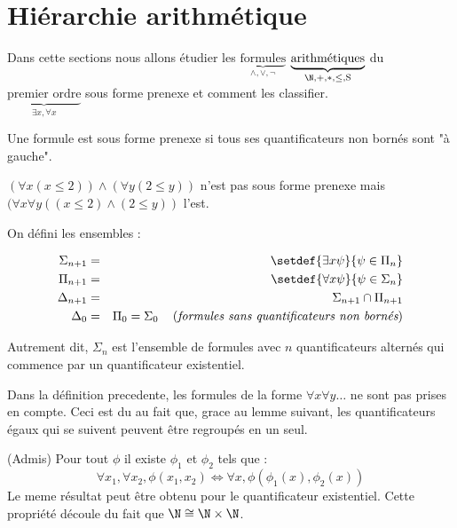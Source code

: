 \section{Hiérarchie arithmétique}


Dans cette sections nous allons étudier les $\underbrace{\text{formules}}_{\land, \lor, \lnot}$
$\underbrace{\text{arithmétiques}}_{\N, +, *, \leq, \text{S}}$ du $\underbrace{\text{premier ordre}}_{\exists x, \forall x}$
sous forme prenexe et comment les classifier.


\begin{definition}
	Une formule est sous forme prenexe si tous ses quantificateurs non bornés sont "à gauche".

	$(\forall x (x \leq 2)) \land  (\forall y (2 \leq y))$ n'est pas sous forme prenexe mais $(\forall x \forall y ((x \leq 2) \land  (2 \leq y))$ l'est.
\end{definition}



\begin{definition}
	On défini les ensembles :

	\begin{eqnarray*}
		\Sigma_{n + 1} &=& \setdef { \exists x \psi } {\psi \in \Pi_n}  \\
		\Pi_{n + 1} &=& \setdef { \forall x \psi } {\psi \in \Sigma_n}  \\
		\Delta_{n + 1} &=& \Sigma_{n + 1} \cap \Pi_{n + 1} \\
		\Delta_0 &=& \Pi_0 = \Sigma_0 \reason {formules sans quantificateurs non bornés}
	\end{eqnarray*}

	Autrement dit, $\Sigma_n$ est l'ensemble de formules avec $n$ quantificateurs alternés qui commence par un quantificateur existentiel.
\end{definition}

\begin{remarque}
	Dans la définition precedente, les formules de la forme $\forall x \forall y \ldots$ ne sont pas prises en compte. Ceci est du au fait que, grace
	au lemme suivant, les quantificateurs égaux qui se suivent peuvent être regroupés en un seul.
\end{remarque}

\begin{lemma}(Admis)
	Pour tout $\phi$ il existe $\phi_1$ et $\phi_2$ tels que :
	$$ \forall x_1, \forall x_2, \phi (x_1,x_2) \iff \forall x, \phi(\phi_1(x), \phi_2(x))$$
	Le meme résultat peut être obtenu pour le quantificateur existentiel.
	Cette propriété découle du fait que $\N \cong \N \times \N$.
\end{lemma}

